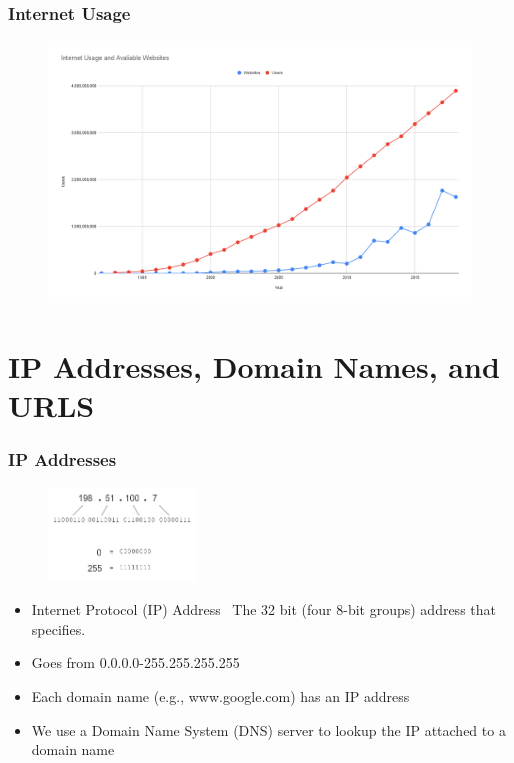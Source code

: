 \documentclass{beamer}
\begin{document}
%
%
\begin{frame}[fragile]
    \frametitle{Internet Usage}
    \begin{figure}
        \includegraphics[width=\textwidth]{./imgs/chart.png}
    \end{figure}
\end{frame}

\section{IP Addresses, Domain Names, and URLS}

%
%
\begin{frame}[fragile]
    \frametitle{IP Addresses}
    \begin{figure}
        \includegraphics[width=0.35\textwidth]{./imgs/ip.png}
    \end{figure}
    \begin{itemize}
        \item Internet Protocol (IP) Address \textrightarrow \ The 32 bit (four 8-bit groups) address that specifies.
        \item Goes from 0.0.0.0-255.255.255.255
        \item Each domain name (e.g., www.google.com) has an IP address 
        \item We use a Domain Name System (DNS) server to lookup the IP attached to a domain name
    \end{itemize}
\end{frame}
\end{document}
